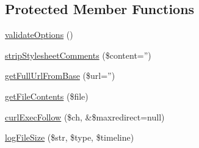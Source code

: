 \subsection*{Protected Member Functions}
\begin{DoxyCompactItemize}
\item 
\hyperlink{class_js_css_chunker_af67fb6c6a578eefd672d15653d6cc4ac}{validateOptions} ()
\item 
\hyperlink{class_js_css_chunker_ae12731eb9a0feb5cffa1f7e75d6f1725}{stripStylesheetComments} (\$content='')
\item 
\hyperlink{class_js_css_chunker_a26b1287f34ee59445195a9ef0211fc61}{getFullUrlFromBase} (\$url='')
\item 
\hyperlink{class_js_css_chunker_a6faf7f9b77a8c591bf7933591edd5fcb}{getFileContents} (\$file)
\item 
\hyperlink{class_js_css_chunker_a409b2e58a3b844cf7b7689b4ef319462}{curlExecFollow} (\$ch, \&\$maxredirect=null)
\item 
\hyperlink{class_js_css_chunker_aa6371d126eb4968c6c9dfa97182f649a}{logFileSize} (\$str, \$type, \$timeline)
\end{DoxyCompactItemize}
